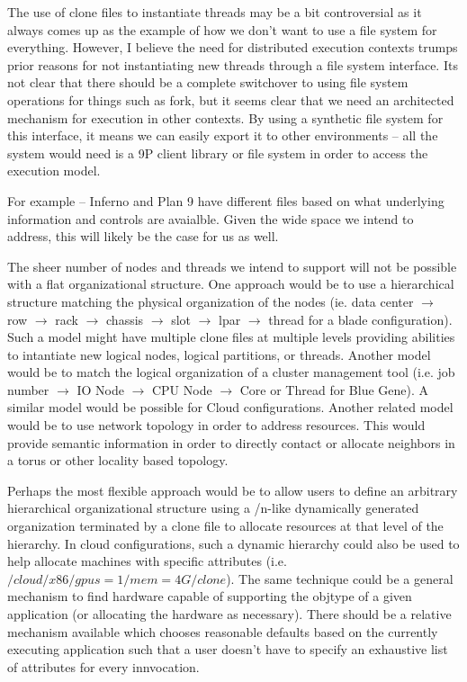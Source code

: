 \documentclass{sig-alternate}
\begin{document}
The use of clone files to instantiate threads may be a bit controversial
as it always comes up as the example of how we don't want to use a file
system for everything.  However, I believe the need for distributed
execution contexts trumps prior reasons for not instantiating new threads
through a file system interface.  Its not clear that there should be a
complete switchover to using file system operations for things such as
fork, but it seems clear that we need an architected mechanism for 
execution in other contexts.  By using a synthetic file system for
this interface, it means we can easily export it to other environments --
all the system would need is a 9P client library or file system in order
to access the execution model.

For example -- Inferno and Plan 9 have different files based on what
underlying information and controls are avaialble.  Given the wide 
space we intend to address, this will likely be the case for us as well.

The sheer number of nodes and threads we intend to support will not
be possible with a flat organizational structure.  One approach would be
to use a hierarchical structure matching the physical organization of the
nodes 
(ie. data center $\rightarrow$ row $\rightarrow$ rack $\rightarrow$ chassis $\rightarrow$ slot $\rightarrow$ lpar $\rightarrow$ thread 
for a blade configuration).  Such a model might have multiple clone files at
multiple levels providing abilities to intantiate new logical nodes, logical
partitions, or threads.
Another model would be to match the logical organization
of a cluster management tool (i.e. job number $\rightarrow$ IO Node $\rightarrow$ CPU Node $\rightarrow$ Core or Thread
for Blue Gene).  A similar model would be possible for Cloud 
configurations.  
Another related model would be to use network topology in order to address
resources.  This would provide semantic information in order to directly
contact or allocate neighbors in a torus or other locality based 
topology.

Perhaps the most flexible approach would be to allow users to define an
arbitrary hierarchical organizational structure using a /n-like dynamically
generated organization terminated by a clone file to allocate resources at
that level of the hierarchy.  In cloud configurations, such a dynamic 
hierarchy could also be used to help allocate machines with specific 
attributes (i.e. $/cloud/x86/gpus=1/mem=4G/clone$).  The same technique
could be a general mechanism to find hardware capable of supporting the
objtype of a given application (or allocating the hardware as necessary).
There should be a relative mechanism available which chooses reasonable
defaults based on the currently executing application such that a user
doesn't have to specify an exhaustive list of attributes for every 
innvocation.
\end{document}
